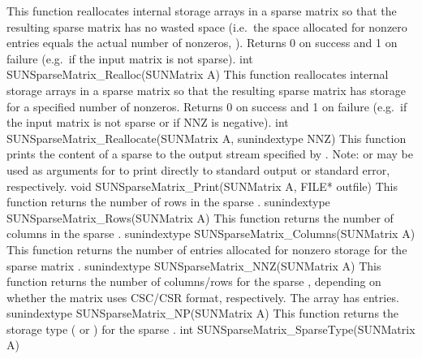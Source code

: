 {
  This function reallocates internal storage arrays in a sparse matrix
  so that the resulting sparse matrix has no wasted space (i.e.~the
  space allocated for nonzero entries equals the actual number of
  nonzeros, ). Returns 0 on success and 
  1 on failure (e.g.~if the input matrix is not sparse).
}
{
  int SUNSparseMatrix\_Realloc(SUNMatrix A)
}
{
  This function reallocates internal storage arrays in a sparse matrix
  so that the resulting sparse matrix has storage for a specified
  number of nonzeros. Returns 0 on success and 
  1 on failure (e.g.~if the input matrix is not sparse or if NNZ is
  negative). 
}
{
  int SUNSparseMatrix\_Reallocate(SUNMatrix A, sunindextype NNZ)
}
{
  This function prints the content of a sparse  to the
  output stream specified by .  Note: 
  or  may be used as arguments for  to print
  directly to standard output or standard error, respectively.
}
{
  void SUNSparseMatrix\_Print(SUNMatrix A, FILE* outfile)
}
{
  This function returns the number of rows in the sparse .
}
{
  sunindextype SUNSparseMatrix\_Rows(SUNMatrix A)
}
{
  This function returns the number of columns in the sparse .
}
{
  sunindextype SUNSparseMatrix\_Columns(SUNMatrix A)
}
{
  This function returns the number of entries allocated for nonzero
  storage for  the sparse matrix .
}
{
  sunindextype SUNSparseMatrix\_NNZ(SUNMatrix A)
}
{
  This function returns the number of columns/rows for the
  sparse , depending on whether the matrix uses CSC/CSR
  format, respectively.  The  array has  entries.
}
{
  sunindextype SUNSparseMatrix\_NP(SUNMatrix A)
}
{
  This function returns the storage type (
  or ) for the sparse .
}
{
  int SUNSparseMatrix\_SparseType(SUNMatrix A)
}
